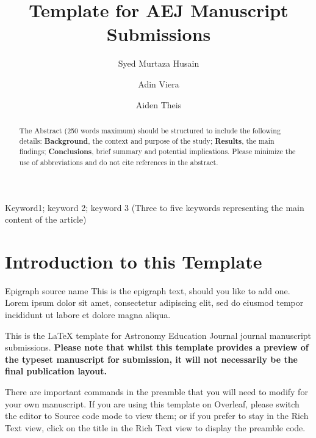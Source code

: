 \documentclass[a4paper,alpha-refs]{aejstyles}
\title{Template for AEJ Manuscript Submissions}
\author[1,\authfn{1},\authfn{2}]{Syed Murtaza Husain}
\author[2,\authfn{1},\authfn{2}]{Adin Viera}
\author[3,\authfn{1},\authfn{2}]{Aiden Theis}
\affil[1]{The University of Texas at Austin}
\begin{document}
\begin{frontmatter}
\maketitle
\begin{abstract}
The Abstract (250 words maximum) should be structured to include the following details: \textbf{Background}, the context and purpose of the study; \textbf{Results}, the main findings; \textbf{Conclusions}, brief summary and potential implications. Please minimize the use of abbreviations and do not cite references in the abstract.
\end{abstract}

\begin{keywords}
Keyword1; keyword 2; keyword 3 (Three to five keywords representing the main content of the article)
\end{keywords}

\end{frontmatter}


\section{Introduction to this Template}

\begin{epigraph}{Epigraph source name}
This is the epigraph text, should you like to add one. Lorem ipsum dolor sit amet, consectetur adipiscing elit, sed do eiusmod tempor incididunt ut labore et dolore magna aliqua. 
\end{epigraph}

This is the \LaTeX{} template for Astronomy Education Journal journal manuscript submissions. \textbf{Please note that whilst this template provides a preview of the typeset manuscript for submission, it will not necessarily be the final publication layout.}

There are important commands in the preamble that you will need to modify for your own manuscript. If you are using this template on Overleaf, please switch the editor to Source code mode to view them; or if you prefer to stay in the Rich Text view, click on the title in the Rich Text view to display the preamble code.
\end{document}
